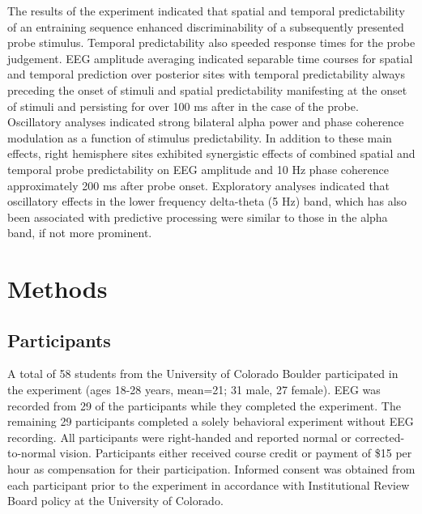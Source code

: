 \documentclass[dwyatte_dissertation.tex]{subfiles}
\begin{document}
The results of the experiment indicated that spatial and temporal predictability of an entraining sequence enhanced discriminability of a subsequently presented probe stimulus. Temporal predictability also speeded response times for the probe judgement. EEG amplitude averaging indicated separable time courses for spatial and temporal prediction over posterior sites with temporal predictability always preceding the onset of stimuli and spatial predictability manifesting at the onset of stimuli and persisting for over 100 ms after in the case of the probe. Oscillatory analyses indicated strong bilateral alpha power and phase coherence modulation as a function of stimulus predictability. In addition to these main effects, right hemisphere sites exhibited synergistic effects of combined spatial and temporal probe predictability on EEG amplitude and 10 Hz phase coherence approximately 200 ms after probe onset. Exploratory analyses indicated that oscillatory effects in the lower frequency delta-theta (5 Hz) band, which has also been associated with predictive processing \cite{ArnalGiraud12,GiraudPoeppel12} were similar to those in the alpha band, if not more prominent. 

\section{Methods}

\subsection{Participants}
A total of 58 students from the University of Colorado Boulder participated in the experiment (ages 18-28 years, mean=21; 31 male, 27 female). EEG was recorded from 29 of the participants while they completed the experiment. The remaining 29 participants completed a solely behavioral experiment without EEG recording. All participants were right-handed and reported normal or corrected-to-normal vision. Participants either received course credit or payment of \$15 per hour as compensation for their participation. Informed consent was obtained from each participant prior to the experiment in accordance with Institutional Review Board policy at the University of Colorado.
\end{document}
